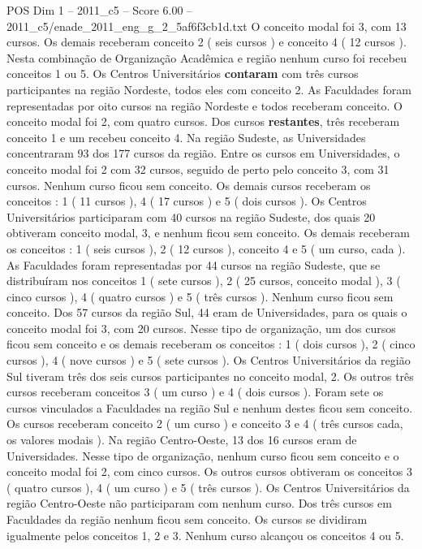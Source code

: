 \begin{textsample}{POS Dim 1 – 2011\_c5 – Score 6.00 – 2011\_c5/enade\_2011\_eng\_g\_2\_5af6f3cb1d.txt}
O conceito modal foi 3, com 13 cursos.
Os demais receberam conceito 2 ( seis cursos ) e conceito 4 ( 12 cursos ).
Nesta combinação de Organização Acadêmica e região nenhum curso foi recebeu conceitos 1 ou 5.
Os Centros Universitários \textbf{contaram} com três cursos participantes na região Nordeste, todos eles com conceito 2.
As Faculdades foram representadas por oito cursos na região Nordeste e todos receberam conceito.
O conceito modal foi 2, com quatro cursos.
Dos cursos \textbf{restantes}, três receberam conceito 1 e um recebeu conceito 4.
Na região Sudeste, as Universidades concentraram 93 dos 177 cursos da região.
Entre os cursos em Universidades, o conceito modal foi 2 com 32 cursos, seguido de perto pelo conceito 3, com 31 cursos.
Nenhum curso ficou sem conceito.
Os demais cursos receberam os conceitos : 1 ( 11 cursos ), 4 ( 17 cursos ) e 5 ( dois cursos ).
Os Centros Universitários participaram com 40 cursos na região Sudeste, dos quais 20 obtiveram conceito modal, 3, e nenhum ficou sem conceito.
Os demais receberam os conceitos : 1 ( seis cursos ), 2 ( 12 cursos ), conceito 4 e 5 ( um curso, cada ).
As Faculdades foram representadas por 44 cursos na região Sudeste, que se distribuíram nos conceitos 1 ( sete cursos ), 2 ( 25 cursos, conceito modal ), 3 ( cinco cursos ), 4 ( quatro cursos ) e 5 ( três cursos ).
Nenhum curso ficou sem conceito.
Dos 57 cursos da região Sul, 44 eram de Universidades, para os quais o conceito modal foi 3, com 20 cursos.
Nesse tipo de organização, um dos cursos ficou sem conceito e os demais receberam os conceitos : 1 ( dois cursos ), 2 ( cinco cursos ), 4 ( nove cursos ) e 5 ( sete cursos ).
Os Centros Universitários da região Sul tiveram três dos seis cursos participantes no conceito modal, 2.
Os outros três cursos receberam conceitos 3 ( um curso ) e 4 ( dois cursos ).
Foram sete os cursos vinculados a Faculdades na região Sul e nenhum destes ficou sem conceito.
Os cursos receberam conceito 2 ( um curso ) e conceito 3 e 4 ( três cursos cada, os valores modais ).
Na região Centro-Oeste, 13 dos 16 cursos eram de Universidades.
Nesse tipo de organização, nenhum curso ficou sem conceito e o conceito modal foi 2, com cinco cursos.
Os outros cursos obtiveram os conceitos 3 ( quatro cursos ), 4 ( um curso ) e 5 ( três cursos ).
Os Centros Universitários da região Centro-Oeste não participaram com nenhum curso.
Dos três cursos em Faculdades da região nenhum ficou sem conceito.
Os cursos se dividiram igualmente pelos conceitos 1, 2 e 3.
Nenhum curso alcançou os conceitos 4 ou 5.

\end{textsample}
